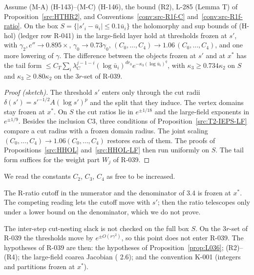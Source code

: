 \begin{proposition}\label{prop:L036}
Assume (M-A) (H-143)--(M-C) (H-146), the bound (R2), L-285 (Lemma T) of Proposition~\ref{src:HTHR2}, and Conventions~\ref{conv:src-R1f-C} and~\ref{conv:src-R1f-ratio}. On the box $S=\{|s'_i-\bar u_i|\le0.1\bar u_i\}$ the holomorphy and sup bounds of (H-hol) (ledger row R-041) in the large-field layer hold at thresholds frozen at $s'$, with $\gamma_2,c''\to0.895\times$, $\gamma_0\to0.73\gamma_0$, $(C_0,\dots,C_4)\to1.06\,(C_0,\dots,C_4)$, and one more lowering of $\gamma$. The difference between the objects frozen at $s'$ and at $x^*$ has the tail form $\le C_T\sum_i\lambda_C^{j-1-i}(\log\bar u_i)^{dr_0}e^{-\kappa_3(\log\bar u_i)^q}$, with $\kappa_3\ge0.734\kappa_2$ on $S$ and $\kappa_3\ge0.80\kappa_2$ on the $3r$-set of R-039.
\end{proposition}
\begin{proof}[Proof (sketch)]
The threshold $s'$ enters only through the cut radii $\delta(s')=s'^{-1/2}A(\log s')^p$ and the split that they induce. The vertex domains stay frozen at $x^*$. On $S$ the cut ratios lie in $e^{\pm1/18}$ and the large-field exponents in $e^{\pm1/9}$. Besides the inclusion C3, three conditions of Proposition~\ref{src:T2-IEPS-LF} compare a cut radius with a frozen domain radius. The joint scaling $(C_0,\dots,C_4)\to1.06(C_0,\dots,C_4)$ restores each of them. The proofs of Propositions~\ref{src:HHOL} and~\ref{src:HHOL-LF} then run uniformly on $S$. The tail form suffices for the weight part $W_j$ of R-039.
\end{proof}

\begin{convention}\label{conv:src-R1f-C}
We read the constants $C_2$, $C_3$, $C_4$ as free to be increased.
\end{convention}

\begin{convention}\label{conv:src-R1f-ratio}
The R-ratio cutoff in the numerator and the denominator of  3.4 is frozen at $x^*$. The competing reading lets the cutoff move with $s'$; then the ratio telescopes only under a lower bound on the denominator, which we do not prove.
\end{convention}

\begin{remark}
The inter-step cut-nesting slack is not checked on the full box $S$. On the $3r$-set of R-039 the thresholds move by $e^{\pm O(r\gamma^2)}$, so this point does not enter R-039. The hypotheses of R-039 are then: the hypotheses of Proposition~\ref{prop:L036}; (R2)--(R4); the large-field coarea Jacobian ( 2.6); and the convention K-001 (integers and partitions frozen at $x^*$).
\end{remark}

